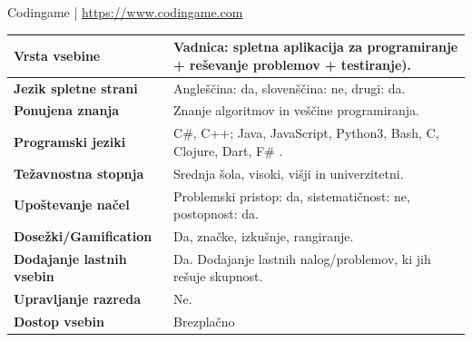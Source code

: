 \begin{osebnabox}[label={osebna:codingame}]{Codingame |
    \url{https://www.codingame.com}}
    \begin{tabular}{
  p{} |
  p{}  }
  \textbf{Vrsta vsebine} & Vadnica: spletna aplikacija za
                           programiranje + reševanje problemov +
                           testiranje). \\
      \hline
  \textbf{Jezik spletne strani} & Angleščina: da, slovenščina: ne,
                                  drugi: da. \\
      \hline
  \textbf{Ponujena znanja} & Znanje algoritmov in veščine programiranja. \\
      \hline
 \textbf{Programski jeziki} & C\#, C++; Java, JavaScript, Python3,
                              Bash, C, Clojure, Dart, F\# .\\  
      \hline
  \textbf{Težavnostna stopnja} & Srednja šola, visoki, višji in
                                 univerzitetni. \\ 
      \hline
   \textbf{Upoštevanje načel} & Problemski pristop: da,
                                sistematičnost: ne, postopnost: da. \\
      \hline
  \textbf{Dosežki/Gamification} & Da, značke, izkušnje, rangiranje. \\
      \hline
  \textbf{Dodajanje lastnih vsebin} & Da. Dodajanje lastnih
                                      nalog/problemov, ki jih rešuje
                                      skupnost. \\
      \hline
  \textbf{Upravljanje razreda} & Ne. \\ 
      \hline
  \textbf{Dostop vsebin} & Brezplačno   \\  

\end{tabular}
\end{osebnabox}


